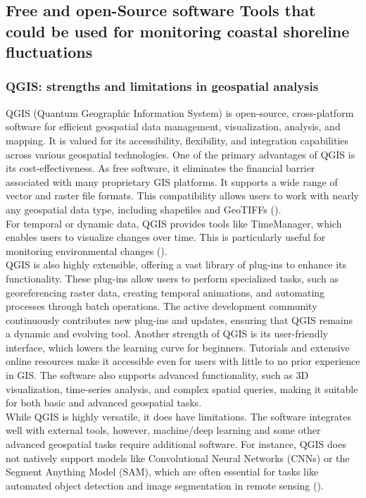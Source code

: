 \documentclass[a4paper,12pt]{article}
\begin{document}
\subsection{Free and open-Source software Tools that could be used for monitoring coastal shoreline fluctuations}
\subsubsection{QGIS: strengths and limitations in geospatial analysis}
QGIS (Quantum Geographic Information System) is open-source, cross-platform software for efficient geospatial data management, visualization, analysis, and mapping. It is valued for its accessibility, flexibility, and integration capabilities across various geospatial technologies.
One of the primary advantages of QGIS is its cost-effectiveness. As free software, it eliminates the financial barrier associated with many proprietary GIS platforms. It supports a wide range of vector and raster file formats. This compatibility allows users to work with nearly any geospatial data type, including shapefiles and GeoTIFFs (\cite{map-site_qgis_nodate}).\\
For temporal or dynamic data, QGIS provides tools like TimeManager, which enables users to visualize changes over time. This is particularly useful for monitoring environmental changes (\cite{map-site_qgis_nodate}).\\
QGIS is also highly extensible, offering a vast library of plug-ins to enhance its functionality. These plug-ins allow users to perform specialized tasks, such as georeferencing raster data, creating temporal animations, and automating processes through batch operations. The active development community continuously contributes new plug-ins and updates, ensuring that QGIS remains a dynamic and evolving tool.
Another strength of QGIS is its user-friendly interface, which lowers the learning curve for beginners. Tutorials and extensive online resources make it accessible even for users with little to no prior experience in GIS. The software also supports advanced functionality, such as 3D visualization, time-series analysis, and complex spatial queries, making it suitable for both basic and advanced geospatial tasks.\\
While QGIS is highly versatile, it does have limitations. The software integrates well with external tools, however, machine/deep learning and some other advanced geospatial tasks require additional software. For instance, QGIS does not natively support models like Convolutional Neural Networks (CNNs) or the Segment Anything Model (SAM), which are often essential for tasks like automated object detection and image segmentation in remote sensing (\cite{gillian_qgis_nodate}).
\end{document}
